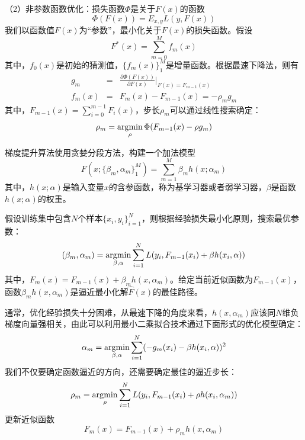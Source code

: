 （2）非参数函数优化：损失函数$\Phi$是关于$F(x)$的函数
\begin{equation}
    \Phi(F(x)) = E_{x,y} L(y,F(x))
\end{equation}
我们以函数值$F(x)$为“参数”，最小化关于$F(x)$的损失函数。假设
\begin{equation}
    F^*(x) = \sum\limits_{m=0}^M f_m(x)
\end{equation}
其中，$f_0(x)$是初始的猜测值，$\{f_m(x)\}_1^M$是增量函数。根据最速下降法，则有
\begin{equation}
    \begin{array}{lll}
      g_m & = & \frac{\partial \Phi(F(x))}{\partial F(x)}\Big |_{F(x) = F_{m-1}(x)} \\
      f_m(x) & = & F_m(x) - F_{m-1}(x) = -\rho_m g_m
    \end{array}
\end{equation}
其中，$F_{m-1}(x) = \sum\limits_{i=0}^{m-1} F_i(x)$，步长$\rho_m$可以通过线性搜索确定：
\begin{equation}
    \rho_m = \operatorname*{\mathrm{\arg\!\min}}_{\rho} \Phi(F_{m-1}(x)- \rho g_m)
\end{equation}

梯度提升算法使用贪婪分段方法，构建一个加法模型
\begin{equation}
    F(x;\{\beta_m,\alpha_m\}_1^M) = \sum\limits_{m=1}^M \beta_m h(x;\alpha_m)
\end{equation}
其中，$h(x;\alpha)$是输入变量$x$的含参函数，称为基学习器或者弱学习器，$\beta$是函数$h(x;\alpha)$的权重。

假设训练集中包含$N$个样本$\{x_i,y_i\}_{i=1}^N$，则根据经验损失最小化原则，搜索最优参数：
\begin{equation}
    (\beta_m,\alpha_m) = \operatorname*{\mathrm{\arg\!\min}}_{\beta,\alpha} \sum\limits_{i=1}^N L(y_i, F_{m-1}(x_i) + \beta h(x_i,\alpha))
\end{equation}
其中，$F_m(x) = F_{m-1}(x) + \beta_m h(x,\alpha_m)$。给定当前近似函数为$F_{m-1}(x)$，函数$\beta_m h(x,\alpha_m)$是逼近最小化解$\hat F(x)$的最佳路径。

通常，优化经验损失十分困难，从最速下降的角度来看，$h(x,\alpha_m)$应该同$N$维负梯度向量强相关，由此可以利用最小二乘拟合技术通过下面形式的优化模型确定：
\begin{equation}
    \alpha_m = \operatorname*{\mathrm{\arg\!\min}}_{\beta,\alpha} \sum\limits_{i=1}^N (-g_m(x_i) - \beta h(x_i,\alpha))^2
\end{equation}
我们不仅要确定函数逼近的方向，还需要确定最佳的逼近步长：
\begin{equation}
    \rho_m = \operatorname*{\mathrm{\arg\!\min}}_{\rho} \sum\limits_{i=1}^N L(y_i, F_{m-1}(x_i) + \rho h(x_i,\alpha_m))
\end{equation}
更新近似函数
\begin{equation}
    F_m(x) = F_{m-1}(x) + \rho_m h(x,\alpha_m)
\end{equation}


